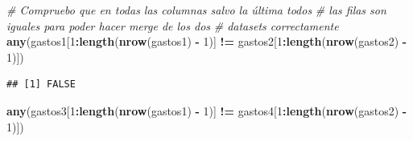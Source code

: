 \documentclass[data,article,submit,moreauthors,pdftex]{Definitions/mdpi}
\newenvironment{Shaded}{\begin{snugshade}}{\end{snugshade}}
\newcommand{\AttributeTok}[1]{\textcolor[rgb]{0.13,0.29,0.53}{#1}}
\newcommand{\CommentTok}[1]{\textcolor[rgb]{0.56,0.35,0.01}{\textit{#1}}}
\newcommand{\DecValTok}[1]{\textcolor[rgb]{0.00,0.00,0.81}{#1}}
\newcommand{\FunctionTok}[1]{\textcolor[rgb]{0.13,0.29,0.53}{\textbf{#1}}}
\newcommand{\NormalTok}[1]{#1}
\newcommand{\OtherTok}[1]{\textcolor[rgb]{0.56,0.35,0.01}{#1}}
\newcommand{\SpecialCharTok}[1]{\textcolor[rgb]{0.81,0.36,0.00}{\textbf{#1}}}
\newcommand{\StringTok}[1]{\textcolor[rgb]{0.31,0.60,0.02}{#1}}
\begin{document}
\begin{Shaded}
\end{Shaded}

\begin{Shaded}
\begin{Highlighting}[]
\CommentTok{\# Compruebo que en todas las columnas salvo la última todos}
\CommentTok{\# las filas son iguales para poder hacer merge de los dos}
\CommentTok{\# datasets correctamente}
\FunctionTok{any}\NormalTok{(gastos1[}\DecValTok{1}\SpecialCharTok{:}\FunctionTok{length}\NormalTok{(}\FunctionTok{nrow}\NormalTok{(gastos1) }\SpecialCharTok{{-}} \DecValTok{1}\NormalTok{)] }\SpecialCharTok{!=}\NormalTok{ gastos2[}\DecValTok{1}\SpecialCharTok{:}\FunctionTok{length}\NormalTok{(}\FunctionTok{nrow}\NormalTok{(gastos2) }\SpecialCharTok{{-}}
    \DecValTok{1}\NormalTok{)])}
\end{Highlighting}
\end{Shaded}

\begin{verbatim}
## [1] FALSE
\end{verbatim}

\begin{Shaded}
\begin{Highlighting}[]
\FunctionTok{any}\NormalTok{(gastos3[}\DecValTok{1}\SpecialCharTok{:}\FunctionTok{length}\NormalTok{(}\FunctionTok{nrow}\NormalTok{(gastos1) }\SpecialCharTok{{-}} \DecValTok{1}\NormalTok{)] }\SpecialCharTok{!=}\NormalTok{ gastos4[}\DecValTok{1}\SpecialCharTok{:}\FunctionTok{length}\NormalTok{(}\FunctionTok{nrow}\NormalTok{(gastos2) }\SpecialCharTok{{-}}
    \DecValTok{1}\NormalTok{)])}
\end{Highlighting}
\end{Shaded}
\end{document}
